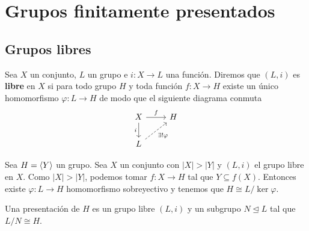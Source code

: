 \documentclass[twoside, 11pt]{article}
\begin{document}
\section{Grupos finitamente presentados}
\subsection{Grupos libres}
\begin{defi}
Sea $X$ un conjunto, $L$ un grupo e $i:X\to L$ una función. Diremos que $(L,i)$ es \textbf{libre} en $X$ si para todo grupo $H$ y toda función $f:X\to H$ existe un único homomorfismo $\varphi:L\to H$ de modo que el siguiente diagrama conmuta
\[
\begin{tikzcd}
X\arrow[r, "f"]\arrow[d,"i"'] & H\\
L\arrow[ur, dashed, "\exists!\varphi"']
\end{tikzcd}
\]
\end{defi}

\begin{observacion}\label{4.2}
Sea $H=\langle{Y}\rangle$ un grupo. Sea $X$ un conjunto con $|X|>|Y|$ y $(L,i)$ el grupo libre en $X$. Como $|X|>|Y|$, podemos tomar $f:X\to H$ tal que $Y\subseteq f(X)$. Entonces existe $\varphi:L\to H$ homomorfismo sobreyectivo y tenemos que $H\cong L/\ker\varphi$.
\end{observacion}

\begin{defi}
Una presentación de $H$ es un grupo libre $(L,i)$ y un subgrupo $N\trianglelefteq L$ tal que $L/N\cong H$. 
\end{defi}
\end{document}
